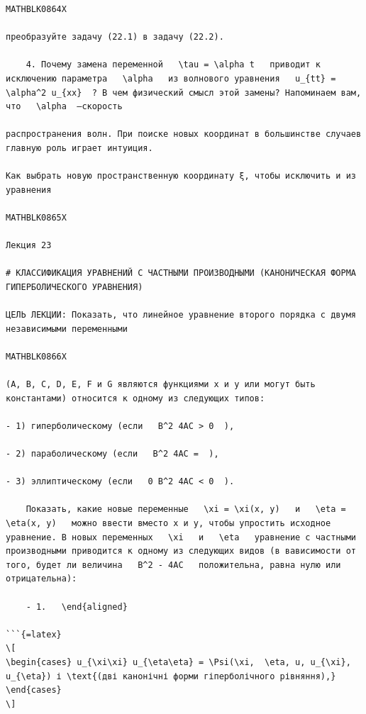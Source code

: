\documentclass[
]{article}
\begin{document}
\begin{verbatim}
MATHBLK0864X

преобразуйте задачу (22.1) в задачу (22.2).

    4. Почему замена переменной   \tau = \alpha t   приводит к исключению параметра   \alpha   из волнового уравнения   u_{tt} = \alpha^2 u_{xx}  ? В чем физический смысл этой замены? Напоминаем вам, что   \alpha  —скорость

распространения волн. При поиске новых координат в большинстве случаев главную роль играет интуиция.

Как выбрать новую пространственную координату ξ, чтобы исключить и из уравнения

MATHBLK0865X

Лекция 23

# КЛАССИФИКАЦИЯ УРАВНЕНИЙ С ЧАСТНЫМИ ПРОИЗВОДНЫМИ (КАНОНИЧЕСКАЯ ФОРМА ГИПЕРБОЛИЧЕСКОГО УРАВНЕНИЯ)

ЦЕЛЬ ЛЕКЦИИ: Показать, что линейное уравнение второго порядка с двумя независимыми переменными

MATHBLK0866X

(A, B, C, D, E, F и G являются функциями x и y или могут быть константами) относится к одному из следующих типов:

- 1) гиперболическому (если   B^2 4AC > 0  ),

- 2) параболическому (если   B^2 4AC =  ),

- 3) эллиптическому (если   0 B^2 4AC < 0  ).

    Показать, какие новые переменные   \xi = \xi(x, y)   и   \eta = \eta(x, y)   можно ввести вместо x и y, чтобы упростить исходное уравнение. В новых переменных   \xi   и   \eta   уравнение с частными производными приводится к одному из следующих видов (в вависимости от того, будет ли величина   B^2 - 4AC   положительна, равна нулю или отрицательна):

    - 1.   \end{aligned}

```{=latex}
\[
\begin{cases} u_{\xi\xi} u_{\eta\eta} = \Psi(\xi,  \eta, u, u_{\xi}, u_{\eta}) і \text{(дві канонічні форми гіперболічного рівняння),} \end{cases}
\]
\end{verbatim}
\end{document}
